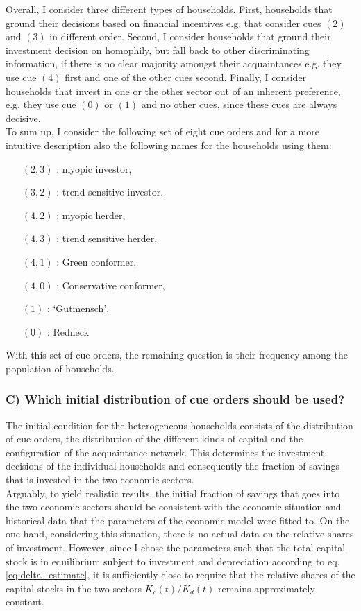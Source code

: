 Overall, I consider three different types of households. First, households that ground their decisions based on financial incentives e.g. that consider cues $(2)$ and $(3)$ in different order. Second, I consider households that ground their investment decision on homophily, but fall back to other discriminating information, if there is no clear majority amongst their acquaintances e.g. they use cue $(4)$ first and one of the other cues second. Finally, I consider households that invest in one or the other sector out of an inherent preference, e.g. they use cue $(0)$ or $(1)$ and no other cues, since these cues are always decisive. \\

To sum up, I consider the following set of eight cue orders and for a more intuitive description also the following names for the households using them:
\begin{itemize}
  \item [$(2, 3)$]: myopic investor,
	\item [$(3, 2)$]: trend sensitive investor,
	\item [$(4, 2)$]: myopic herder,
	\item [$(4, 3)$]: trend sensitive herder,
	\item [$(4, 1)$]: Green conformer,
	\item [$(4, 0)$]: Conservative conformer,
	\item [$(1)$]: `Gutmensch',
	\item [$(0)$]: Redneck
\end{itemize}
With this set of cue orders, the remaining question is their frequency among the population of households.

\subsubsection*{C) Which initial distribution of cue orders should be used?}

The initial condition for the heterogeneous households consists of the distribution of cue orders, the distribution of the different kinds of capital and the configuration of the acquaintance network. This determines the investment decisions of the individual households and consequently the fraction of savings that is invested in the two economic sectors. \\
Arguably, to yield realistic results, the initial fraction of savings that goes into the two economic sectors should be consistent with the economic situation and historical data that the parameters of the economic model were fitted to. On the one hand, considering this situation, there is no actual data on the relative shares of investment. However, since I chose the parameters such that the total capital stock is in equilibrium subject to investment and depreciation according to eq. \ref{eq:delta_estimate}, it is sufficiently close to require that the relative shares of the capital stocks in the two sectors $K_c(t)/K_d(t)$ remains approximately constant.\\

